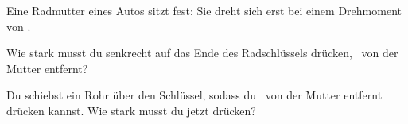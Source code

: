 Eine Radmutter eines Autos sitzt fest: Sie dreht sich erst bei einem Drehmoment von \MO.

\begin{abcliste}
\abc
Wie stark musst du senkrecht auf das Ende des Radschlüssels drücken, \laO\ von der Mutter entfernt?

\abc
Du schiebst ein Rohr über den Schlüssel, sodass du \lbO\ von der Mutter entfernt drücken kannst. Wie stark musst du jetzt drücken?
\end{abcliste}
